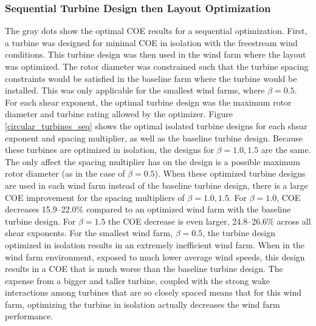 \subsubsection{Sequential Turbine Design then Layout Optimization}
The gray dots show the optimal COE results for a sequential optimization. First, a turbine was designed for minimal COE in isolation with the freestream wind conditions. This turbine design was then used in the wind farm where the layout was optimized. 
The rotor diameter was constrained such that the turbine spacing constraints would be satisfied in the baseline farm where the turbine would be installed. This was only applicable for the smallest wind farms, where $\beta=0.5$. 
For each shear exponent, the optimal turbine design was the maximum rotor diameter and turbine rating allowed by the optimizer.
Figure \ref{circular_turbines_seq} shows the optimal isolated turbine designs for each shear exponent and spacing multiplier, as well as the baseline turbine design. Because these turbines are optimized in isolation, the designs for $\beta=1.0,1.5$ are the same. The only affect the spacing multiplier has on the design is a possible maximum rotor diameter (as in the case of $\beta=0.5$).
When these optimized turbine designs are used in each wind farm instead of the baseline turbine design, there is a large COE improvement for the spacing multipliers of $\beta=1.0, 1.5$. For $\beta=1.0$, COE decreases 15.9--22.0\% compared to an optimized wind farm with the baseline turbine design. For $\beta=1.5$ the COE decrease is even larger, 24.8--26.6\% across all shear exponents. 
For the smallest wind farm, $\beta=0.5$, the turbine design optimized in isolation results in an extremely inefficient wind farm. When in the wind farm environment, exposed to much lower average wind speeds, this design results in a COE that is much worse than the baseline turbine design. The expense from a bigger and taller turbine, coupled with the strong wake interactions among turbines that are so closely spaced means that for this wind farm, optimizing the turbine in isolation actually decreases the wind farm performance. 

